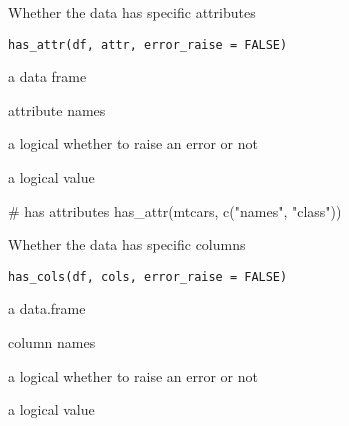 \documentclass[letterpaper]{book}
\begin{document}
%
\begin{Description}
Whether the data has specific attributes
\end{Description}
%
\begin{Usage}
\begin{verbatim}
has_attr(df, attr, error_raise = FALSE)
\end{verbatim}
\end{Usage}
%
\begin{Arguments}
\begin{ldescription}
\item[\code{df}] a data frame

\item[\code{attr}] attribute names

\item[\code{error\_raise}] a logical whether to raise an error or not
\end{ldescription}
\end{Arguments}
%
\begin{Value}
a logical value
\end{Value}
%
\begin{Examples}
\begin{ExampleCode}
# has attributes
has_attr(mtcars, c("names", "class"))

\end{ExampleCode}
\end{Examples}
%
\begin{Description}
Whether the data has specific columns
\end{Description}
%
\begin{Usage}
\begin{verbatim}
has_cols(df, cols, error_raise = FALSE)
\end{verbatim}
\end{Usage}
%
\begin{Arguments}
\begin{ldescription}
\item[\code{df}] a data.frame

\item[\code{cols}] column names

\item[\code{error\_raise}] a logical whether to raise an error or not
\end{ldescription}
\end{Arguments}
%
\begin{Value}
a logical value
\end{Value}
\end{document}
